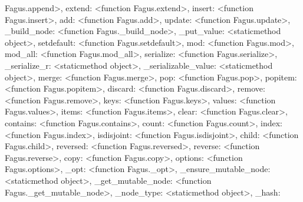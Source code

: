 \documentclass[a4paper,10pt,english]{sphinxmanual}
\begin{document}
\begin{fulllineitems}
\begin{fulllineitems}
Fagus.append\textgreater{}, \textquotesingle{}extend\textquotesingle{}: \textless{}function Fagus.extend\textgreater{}, \textquotesingle{}insert\textquotesingle{}: \textless{}function Fagus.insert\textgreater{}, \textquotesingle{}add\textquotesingle{}: \textless{}function Fagus.add\textgreater{}, \textquotesingle{}update\textquotesingle{}: \textless{}function Fagus.update\textgreater{}, \textquotesingle{}\_build\_node\textquotesingle{}: \textless{}function Fagus.\_build\_node\textgreater{}, \textquotesingle{}\_put\_value\textquotesingle{}: \textless{}staticmethod object\textgreater{}, \textquotesingle{}setdefault\textquotesingle{}: \textless{}function Fagus.setdefault\textgreater{}, \textquotesingle{}mod\textquotesingle{}: \textless{}function Fagus.mod\textgreater{}, \textquotesingle{}mod\_all\textquotesingle{}: \textless{}function Fagus.mod\_all\textgreater{}, \textquotesingle{}serialize\textquotesingle{}: \textless{}function Fagus.serialize\textgreater{}, \textquotesingle{}\_serialize\_r\textquotesingle{}: \textless{}staticmethod object\textgreater{}, \textquotesingle{}\_serializable\_value\textquotesingle{}: \textless{}staticmethod object\textgreater{}, \textquotesingle{}merge\textquotesingle{}: \textless{}function Fagus.merge\textgreater{}, \textquotesingle{}pop\textquotesingle{}: \textless{}function Fagus.pop\textgreater{}, \textquotesingle{}popitem\textquotesingle{}: \textless{}function Fagus.popitem\textgreater{}, \textquotesingle{}discard\textquotesingle{}: \textless{}function Fagus.discard\textgreater{}, \textquotesingle{}remove\textquotesingle{}: \textless{}function Fagus.remove\textgreater{}, \textquotesingle{}keys\textquotesingle{}: \textless{}function Fagus.keys\textgreater{}, \textquotesingle{}values\textquotesingle{}: \textless{}function Fagus.values\textgreater{}, \textquotesingle{}items\textquotesingle{}: \textless{}function Fagus.items\textgreater{}, \textquotesingle{}clear\textquotesingle{}: \textless{}function Fagus.clear\textgreater{}, \textquotesingle{}contains\textquotesingle{}: \textless{}function Fagus.contains\textgreater{}, \textquotesingle{}count\textquotesingle{}: \textless{}function Fagus.count\textgreater{}, \textquotesingle{}index\textquotesingle{}: \textless{}function Fagus.index\textgreater{}, \textquotesingle{}isdisjoint\textquotesingle{}: \textless{}function Fagus.isdisjoint\textgreater{}, \textquotesingle{}child\textquotesingle{}: \textless{}function Fagus.child\textgreater{}, \textquotesingle{}reversed\textquotesingle{}: \textless{}function Fagus.reversed\textgreater{}, \textquotesingle{}reverse\textquotesingle{}: \textless{}function Fagus.reverse\textgreater{}, \textquotesingle{}copy\textquotesingle{}: \textless{}function Fagus.copy\textgreater{}, \textquotesingle{}options\textquotesingle{}: \textless{}function Fagus.options\textgreater{}, \textquotesingle{}\_opt\textquotesingle{}: \textless{}function Fagus.\_opt\textgreater{}, \textquotesingle{}\_ensure\_mutable\_node\textquotesingle{}: \textless{}staticmethod object\textgreater{}, \textquotesingle{}\_get\_mutable\_node\textquotesingle{}: \textless{}function Fagus.\_get\_mutable\_node\textgreater{}, \textquotesingle{}\_node\_type\textquotesingle{}: \textless{}staticmethod object\textgreater{}, \textquotesingle{}\_hash\textquotesingle{}: 
\end{fulllineitems}
\end{fulllineitems}
\end{document}
